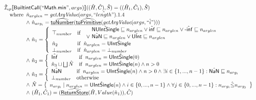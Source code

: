 \[\begin{array}{ll}
\hat{\mathcal{I}} _{cp}\llbracket \mbox{\textsf{BuiltintCall}}(``\mbox{\textsf{Math.min}}",args)\rrbracket((\hat{H},\hat{C}), \hat{S})
  = ((\hat{H}_1, \hat{C}_1), \hat{S})\\
\quad{\rm where}\begin{array}[t]{l}
  \hat{n}_{arglen} = \emph{getArgValue}(args, \hat{``length"}).1.4\\
  \land\ \hat{n}_{arg_i} = \widehat{\underline{\sf toNumber}}(\widehat{\underline{\sf toPrimitive}}(\emph{getArgValue}(args, \hat{``i"})))\\
  \land\ \hat{n}_1 = \left\{\begin{array}{ll}
      \top_{number} & {\rm if}\begin{array}[t]{l}\begin{array}{l}
          \quad \hat{\mbox{\textsf{NUIntSingle}}} \sqsubseteq n_{arglen} \lor \hat{\mbox{\textsf{inf}}} \sqsubseteq n_{arglen}        
          \lor \hat{\mbox{\textsf{-inf}}} \sqsubseteq n_{arglen}\\
          \lor\ \hat{\mbox{\textsf{NaN}}} \sqsubseteq n_{arglen} \lor \hat{\mbox{\textsf{UInt}}} \sqsubseteq n_{arglen}
        \end{array}\end{array}\\
      \hat{n}_2 & {\rm if}\begin{array}[t]{l}\hat{n}_{arglen} = \hat{\mbox{\textsf{UIntSingle}}}\end{array}\\
      \bot_{number} &  {\rm if}\begin{array}[t]{l}\hat{n}_{arglen} = \bot_{number}\end{array}\\
    \end{array}\right.\\
  \land\ \hat{n}_2 = \left\{\begin{array}{ll}
      \hat{\mbox{\textsf{Inf}}} & {\rm if}\begin{array}[t]{l}n_{arglen} = \hat{\mbox{\textsf{UIntSingle}}}(0)\end{array}\\
      \hat{n}_3 \sqcup \bigsqcup \hat{N}& {\rm if}\begin{array}[t]{l}n_{arglen} = \hat{\mbox{\textsf{UIntSingle}}}(n) \land n > 0\end{array}\\
    \end{array}\right.\\
  \land\ \hat{n}_3 = \left\{\begin{array}{ll}
      \hat{\mbox{\textsf{NaN}}}
      & {\rm if}\begin{array}[t]{l}n_{arglen} = \hat{\mbox{\textsf{UIntSingle}}}(n)
        \land n > 0 \land \exists i \in \{1,..., n-1\}: \hat{\mbox{\textsf{NaN}}} \sqsubseteq {n}_{arg_i}\end{array}\\
      \bot_{number} & {\rm otherwise}
    \end{array}\right.\\
  \land\ \hat{N} = \left\{\begin{array}{l}{n}_{arg_i} \mid n_{arglen} = \hat{\mbox{\textsf{UIntSingle}}}(n)
    \land i \in \{0,...,n-1\} \land \forall j \in \{0,...,n-1\}: {n}_{arg_i} \hat{\leq} {n}_{arg_j}\end{array}\right\}\\
  \land\ (\hat{H}_1, \hat{C}_1) = (\widehat{\underline{\sf ReturnStore}}(\hat{H}, Value(\hat{n}_1)), \hat{C})
  \end{array}\\
\\\\

\end{array}
\]
